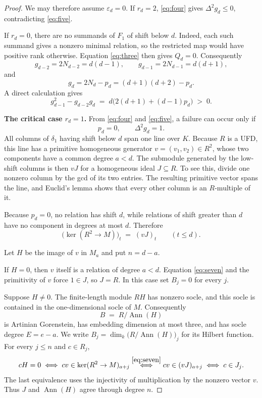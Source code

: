 \documentclass[11pt]{article}
\theoremstyle{remark}
\newcommand{\Ann}{\operatorname{Ann}}
\begin{document}
\begin{proof}
We may therefore assume $\varepsilon_d = 0$. If $r_d = 2$, \eqref{eq:four}
gives $\Delta^2 g_d \le 0$, contradicting \eqref{eq:five}.

If $r_d = 0$, there are no summands of $F_1$ of shift below $d$. Indeed,
each such summand gives a nonzero minimal relation, so the restricted map
would have positive rank otherwise. Equation \eqref{eq:three} then gives
$Q_d = 0$. Consequently
\[
  g_{d-2} = 2N_{d-2} = d(d-1), \qquad g_{d-1} = 2N_{d-1} = d(d+1),
\]
and
\[
  g_d = 2N_d - p_d = (d+1)(d+2) - p_d .
\]
A direct calculation gives
\[
  g_{d-1}^2 - g_{d-2} g_d \;=\; d \bigl( 2(d+1) + (d-1) p_d \bigr) \;>\; 0 .
\]

\medskip
\noindent\textbf{The critical case $r_d = 1$.}
From \eqref{eq:four} and \eqref{eq:five}, a failure can occur only if
\begin{equation} \label{eq:six}
  p_d = 0, \qquad \Delta^2 g_d = 1 .
\end{equation}
All columns of $\delta_1$ having shift below $d$ span one line over $K$.
Because $R$ is a UFD, this line has a primitive homogeneous generator
$v = (v_1, v_2) \in R^2$, whose two components have a common degree $a < d$.
The submodule generated by the low-shift columns is then $vJ$ for a
homogeneous ideal $J \subseteq R$. To see this, divide one nonzero column by
the gcd of its two entries. The resulting primitive vector spans the line,
and Euclid's lemma shows that every other column is an $R$-multiple of it.

Because $p_d = 0$, no relation has shift $d$, while relations of shift
greater than $d$ have no component in degrees at most $d$. Therefore
\begin{equation} \label{eq:seven}
  \bigl( \ker(R^2 \to M) \bigr)_t \;=\; (vJ)_t \qquad (t \le d).
\end{equation}

Let $H$ be the image of $v$ in $M_a$ and put $n = d - a$.

If $H = 0$, then $v$ itself is a relation of degree $a < d$. Equation
\eqref{eq:seven} and the primitivity of $v$ force $1 \in J$, so $J = R$. In
this case set $B_j = 0$ for every $j$.

Suppose $H \ne 0$. The finite-length module $RH$ has nonzero socle, and this
socle is contained in the one-dimensional socle of $M$. Consequently
\[
  B \;=\; R/\Ann(H)
\]
is Artinian Gorenstein, has embedding dimension at most three, and has socle
degree $E = e - a$. We write $B_j = \dim_k \bigl( R/\Ann(H) \bigr)_j$ for its
Hilbert function. For every $j \le n$ and $c \in R_j$,
\[
  cH = 0
  \iff cv \in \ker(R^2 \to M)_{a+j}
  \overset{\eqref{eq:seven}}{\iff} cv \in (vJ)_{a+j}
  \iff c \in J_j .
\]
The last equivalence uses the injectivity of multiplication by the nonzero
vector $v$. Thus $J$ and $\Ann(H)$ agree through degree $n$.


\end{proof}
\end{document}
